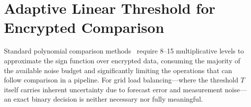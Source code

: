 \documentclass[conference]{IEEEtran}
\begin{document}
\begin{table}[!t]
\centering
\caption{Encrypted Vector Operations: Complexity Summary}
\label{tab:ops_summary}
\footnotesize
{}
\end{table}

\section{Adaptive Linear Threshold for Encrypted Comparison}
\label{sec:alt_method}

Standard polynomial comparison methods~\cite{Kim2018comparison,Cheon2019comparison} require 8--15 multiplicative levels to approximate the sign function over encrypted data, consuming the majority of the available noise budget and significantly limiting the operations that can follow comparison in a pipeline. For grid load balancing---where the threshold $T$ itself carries inherent uncertainty due to forecast error and measurement noise---an exact binary decision is neither necessary nor fully meaningful.
\end{document}
